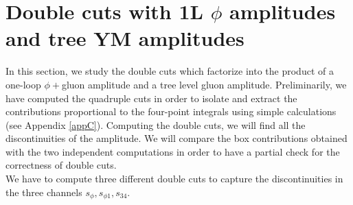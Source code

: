 \section{Double cuts with 1L $\phi$ amplitudes and tree YM amplitudes} \label{sec:cutphi}
In this section, we study the double cuts which factorize into the product of a one-loop $\phi+$gluon amplitude and a tree level gluon amplitude. Preliminarily, we have computed the quadruple cuts in order to isolate and extract the contributions proportional to the four-point integrals using simple calculations (see Appendix \ref{appC}). Computing the double cuts, we will find all the discontinuities of the amplitude. We will compare the box contributions obtained with the two independent computations in order to have a partial check for the correctness of double cuts.\\
We have to compute three different double cuts to capture the discontinuities in the three channels $s_\phi, s_{\phi1}, s_{34}$.\\
\vspace{-0.2cm}
\noindent
